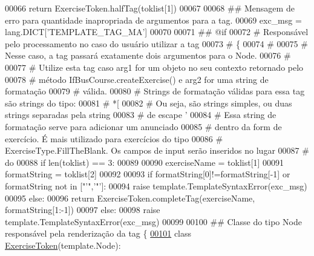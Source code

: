 \begin{DoxyCode}
{{{{{{{{{00066         \textcolor{keywordflow}{return} ExerciseToken.halfTag(toklist[1])
00067 
00068     \textcolor{comment}{## Mensagem de erro para quantidade inapropriada de argumentos para a tag.}
00069     exc\_msg = lang.DICT[\textcolor{stringliteral}{'TEMPLATE\_TAG\_MA'}] %
00070 
00071     \textcolor{comment}{## @if}
00072     \textcolor{comment}{#   Responsável pelo processamento no caso do usuário utilizar a tag}
00073     \textcolor{comment}{# \{%
00074     \textcolor{comment}{#}
00075     \textcolor{comment}{#   Nesse caso, a tag passará exatamente dois argumentos para o Node.}
00076     \textcolor{comment}{#}
00077     \textcolor{comment}{#   Utilize esta tag caso arg1 for um objeto no seu contexto retornado pelo}
00078     \textcolor{comment}{# método IfBusCourse.createExercise() e arg2 for uma string de formatação}
00079     \textcolor{comment}{# válida.}
00080     \textcolor{comment}{#   Strings de formatação válidas para essa tag são strings do tipo:}
00081     \textcolor{comment}{#       *[%
00082     \textcolor{comment}{#   Ou seja, são strings simples, ou duas strings separadas pela string}
00083     \textcolor{comment}{# de escape '%
00084     \textcolor{comment}{#   Essa string de formatação serve para adicionar um anunciado}
00085     \textcolor{comment}{# dentro da form de exercício. É mais utilizado para exercícios do tipo}
00086     \textcolor{comment}{# ExerciseType.FillTheBlank. Os campos de input serão inseridos no lugar}
00087     \textcolor{comment}{# do %
00088     \textcolor{keywordflow}{if} len(toklist) == 3:
00089 
00090         exerciseName = toklist[1]
00091         formatString = toklist[2]
00092 
00093         \textcolor{keywordflow}{if} formatString[0]!=formatString[-1] \textcolor{keywordflow}{or} formatString \textcolor{keywordflow}{not} \textcolor{keywordflow}{in} [\textcolor{stringliteral}{"'"},\textcolor{stringliteral}{'"'}]:
00094             \textcolor{keywordflow}{raise} template.TemplateSyntaxError(exc\_msg)
00095         \textcolor{keywordflow}{else}:
00096             \textcolor{keywordflow}{return} ExerciseToken.completeTag(exerciseName, formatString[1:-1])
00097     \textcolor{keywordflow}{else}:
00098         \textcolor{keywordflow}{raise} template.TemplateSyntaxError(exc\_msg)
00099 
00100 \textcolor{comment}{## Classe do tipo Node responsável pela renderização da tag \{%
\hypertarget{exercises_8py_source_l00101}{}\hyperlink{classCourse_1_1templatetags_1_1exercises_1_1ExerciseToken}{00101} \textcolor{keyword}{class }\hyperlink{classCourse_1_1templatetags_1_1exercises_1_1ExerciseToken}{ExerciseToken}(template.Node):
}}}}}}}}}}}}}}
\end{DoxyCode}
